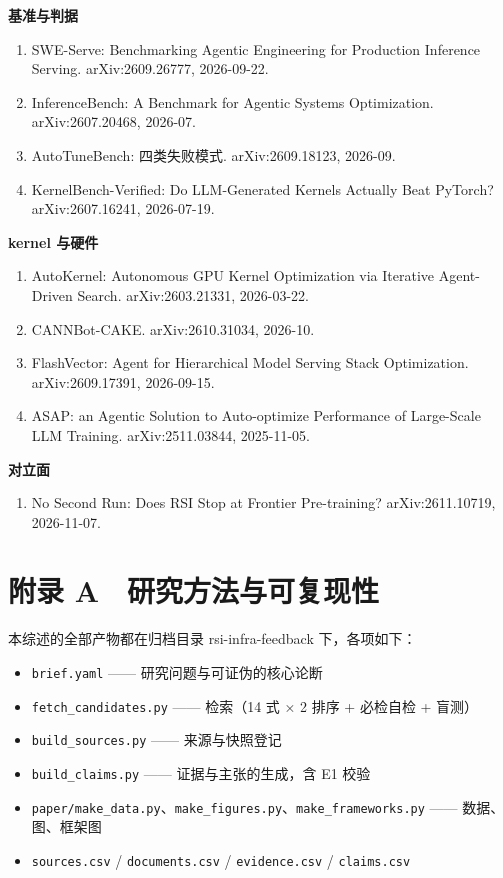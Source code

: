 \textbf{基准与判据}


\begin{enumerate}
  \item SWE-Serve: Benchmarking Agentic Engineering for Production Inference Serving. arXiv:2609.26777, 2026-09-22.
  \item InferenceBench: A Benchmark for Agentic Systems Optimization. arXiv:2607.20468, 2026-07.
  \item AutoTuneBench: 四类失败模式. arXiv:2609.18123, 2026-09.
  \item KernelBench-Verified: Do LLM-Generated Kernels Actually Beat PyTorch? arXiv:2607.16241, 2026-07-19.
\end{enumerate}

\textbf{kernel 与硬件}


\begin{enumerate}
  \item AutoKernel: Autonomous GPU Kernel Optimization via Iterative Agent-Driven Search. arXiv:2603.21331, 2026-03-22.
  \item CANNBot-CAKE. arXiv:2610.31034, 2026-10.
  \item FlashVector: Agent for Hierarchical Model Serving Stack Optimization. arXiv:2609.17391, 2026-09-15.
  \item ASAP: an Agentic Solution to Auto-optimize Performance of Large-Scale LLM Training. arXiv:2511.03844, 2025-11-05.
\end{enumerate}

\textbf{对立面}


\begin{enumerate}
  \item No Second Run: Does RSI Stop at Frontier Pre-training? arXiv:2611.10719, 2026-11-07.
\end{enumerate}


\section{附录 A　研究方法与可复现性}

本综述的全部产物都在归档目录 rsi-infra-feedback 下，各项如下：


\begin{itemize}
  \item \texttt{brief.yaml} —— 研究问题与可证伪的核心论断
  \item \texttt{fetch\_candidates.py} —— 检索（14 式 × 2 排序 + 必检自检 + 盲测）
  \item \texttt{build\_sources.py} —— 来源与快照登记
  \item \texttt{build\_claims.py} —— 证据与主张的生成，含 E1 校验
  \item \texttt{paper/make\_data.py}、\texttt{make\_figures.py}、\texttt{make\_frameworks.py} —— 数据、图、框架图
  \item \texttt{sources.csv} / \texttt{documents.csv} / \texttt{evidence.csv} / \texttt{claims.csv}
\end{itemize}

